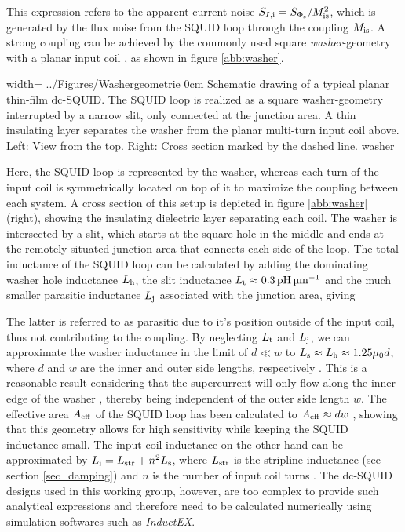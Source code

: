 
This expression refers to the apparent current noise $S_{I\rm ,i}=S_{\rm \Phi_s}/M_{\rm is}^2$, which is generated by the flux noise from the SQUID loop through the coupling $M_{\rm is}$. A strong coupling can be achieved by the commonly used square \textit{washer}-geometry with a planar input coil \cite{Jay1981}, as shown in figure \ref{abb:washer}. 

{width=\textwidth}
{../Figures/Washergeometrie}
{0cm}   %
{Schematic drawing of a typical planar thin-film dc-SQUID. The SQUID loop is realized as a square washer-geometry interrupted by a narrow slit, only connected at the junction area. A thin insulating layer separates the washer from the planar multi-turn input coil above. Left: View from the top. Right: Cross section marked by the dashed line.}
{washer}

Here, the SQUID loop is represented by the washer, whereas each turn of the input coil is symmetrically located on top of it to maximize the coupling between each system. A cross section of this setup is depicted in figure \ref{abb:washer} (right), showing the insulating dielectric layer separating each coil. The washer is intersected by a slit, which starts at the square hole in the middle and ends at the remotely situated junction area that connects each side of the loop. The total inductance of the SQUID loop can be calculated by adding the dominating washer hole inductance $L_{\rm h}$, the slit inductance $L_{\rm t}\approx \qty{0.3}{\pH\per\um}$ and the much smaller parasitic inductance $L_{\rm j}$ associated with the junction area, giving \cite{Ketchen1991}


The latter is referred to as parasitic due to it's position outside of the input coil, thus not contributing to the coupling. By neglecting $L_{\rm t}$ and $L_{\rm j}$, we can approximate the washer inductance in the limit of $d\ll w$ to $L_{\rm s}\approx L_{\rm h}\approx 1.25{\rm\mu_0}d$, where $d$ and $w$ are the inner and outer side lengths, respectively \cite{Ketchen1981}. This is a reasonable result considering that the supercurrent will only flow along the inner edge of the washer \cite{Ketchen1982}, thereby being independent of the outer side length $w$. The effective area $A_{\rm eff}$ of the SQUID loop has been calculated to $A_{\rm eff}\approx dw$ \cite{Ketchen1985}, showing that this geometry allows for high sensitivity while keeping the SQUID inductance small. The input coil inductance on the other hand can be approximated by $L_{\rm i}=L_{\rm str}+n^2L_{\rm s}$, where $L_{\rm str}$ is the stripline inductance (see section \ref{sec_damping}) and $n$ is the number of input coil turns \cite{Ketchen1981}. The dc-SQUID designs used in this working group, however, are too complex to provide such analytical expressions and therefore need to be calculated numerically using simulation softwares such as \textit{InductEX}. 

